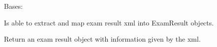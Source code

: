 \documentclass[letterpaper,10pt,english]{sphinxmanual}
\begin{document}

\begin{fulllineitems}
\label{cv_kickstarter:cv_kickstarter.cnapi.ExamResultXmlMapper}
Bases: 

Is able to extract and map exam result xml into ExamResult objects.

\begin{fulllineitems}
\label{cv_kickstarter:cv_kickstarter.cnapi.ExamResultXmlMapper.exam_result}
Return an exam result object with information given by the xml.

\end{fulllineitems}


\end{fulllineitems}

\end{document}
